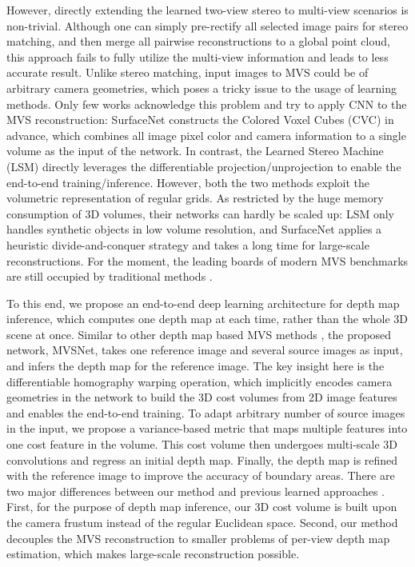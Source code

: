 \documentclass[runningheads]{llncs}
\begin{document}
However, directly extending the learned two-view stereo to multi-view scenarios is non-trivial. Although one can simply pre-rectify all selected image pairs for stereo matching, and then merge all pairwise reconstructions to a global point cloud, this approach fails to fully utilize the multi-view information and leads to less accurate result. Unlike stereo matching, input images to MVS could be of arbitrary camera geometries, which poses a tricky issue to the usage of learning methods. Only few works acknowledge this problem and try to apply CNN to the MVS reconstruction: SurfaceNet \cite{ji2017surfacenet} constructs the Colored Voxel Cubes (CVC) in advance, which combines all image pixel color and camera information to a single volume as the input of the network. In contrast, the Learned Stereo Machine (LSM) \cite{kar2017learning} directly leverages the differentiable projection/unprojection to enable the end-to-end training/inference. However, both the two methods exploit the volumetric representation of regular grids. As restricted by the huge memory consumption of 3D volumes, their networks can hardly be scaled up: LSM only handles synthetic objects in low volume resolution, and SurfaceNet applies a heuristic divide-and-conquer strategy and takes a long time for large-scale reconstructions. For the moment, the leading boards of modern MVS benchmarks are still occupied by traditional methods \cite{furukawa2010accurate,galliani2015massively,schonberger2016pixelwise}.

To this end, we propose an end-to-end deep learning architecture for depth map inference, which computes one depth map at each time, rather than the whole 3D scene at once. Similar to other depth map based MVS methods \cite{tola2012efficient,campbell2008using,galliani2015massively,schonberger2016pixelwise}, the proposed network, MVSNet, takes one reference image and several source images as input, and infers the depth map for the reference image. The key insight here is the differentiable homography warping operation, which implicitly encodes camera geometries in the network to build the 3D cost volumes from 2D image features and enables the end-to-end training. To adapt arbitrary number of source images in the input, we propose a variance-based metric that maps multiple features into one cost feature in the volume. This cost volume then undergoes multi-scale 3D convolutions and regress an initial depth map. Finally, the depth map is refined with the reference image to improve the accuracy of boundary areas. There are two major differences between our method and previous learned approaches \cite{kar2017learning,ji2017surfacenet}. First, for the purpose of depth map inference, our 3D cost volume is built upon the camera frustum instead of the regular Euclidean space. Second, our method decouples the MVS reconstruction to smaller problems of per-view depth map estimation, which makes large-scale reconstruction possible.
\end{document}
